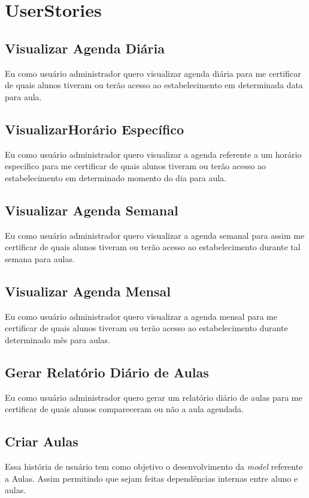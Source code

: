 \section[UserStories]{UserStories}
\subsection[Visualizar Agenda Diária]{Visualizar Agenda Diária}
Eu como usuário administrador quero visualizar agenda diária para
me certificar de quais alunos tiveram ou terão acesso ao estabelecimento
em determinada data para aula.

\subsection[Visualizar Horário Específico]{VisualizarHorário Específico}
Eu como usuário administrador quero visualizar a agenda referente a um horário
específico para me certificar de quais alunos tiveram ou terão acesso ao
estabelecimento em determinado momento do dia para aula.

\subsection[Visualizar Agenda Semanal]{Visualizar Agenda Semanal}
Eu como usuário administrador quero visualizar a agenda semanal para assim me
certificar de quais alunos tiveram ou terão acesso ao estabelecimento durante tal
semana para aulas.

\subsection[Visualizar Agenda Mensal]{Visualizar Agenda Mensal}
Eu como usuário administrador quero visualizar a agenda mensal para me
certificar de quais alunos tiveram ou terão acesso ao estabelecimento durante
determinado mês para aulas.

\subsection[Gerar Relatório Diário de Aulas]{Gerar Relatório Diário de Aulas}
Eu como usuário administrador quero gerar um relatório diário de aulas para me
certificar de quais alunos compareceram ou não a aula agendada.

\subsection[Criar Aulas]{Criar Aulas}
Essa história de usuário tem como objetivo o desenvolvimento da \textsl{model} referente
a Aulas. Assim permitindo que sejam feitas dependências internas entre aluno
e aulas.

